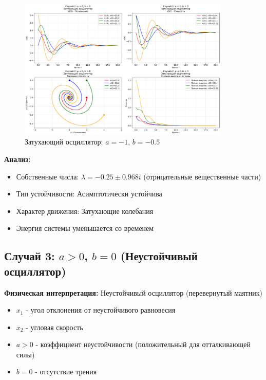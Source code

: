 \begin{figure}[H]
    \centering
    \includegraphics[width=0.9\textwidth]{images/task3/oscillator_case2_damped.png}
    \caption{Затухающий осциллятор: $a = -1$, $b = -0.5$}
\end{figure}

\textbf{Анализ:}
\begin{itemize}
    \item Собственные числа: $\lambda = -0.25 \pm 0.968i$ (отрицательные вещественные части)
    \item Тип устойчивости: Асимптотически устойчива
    \item Характер движения: Затухающие колебания
    \item Энергия системы уменьшается со временем
\end{itemize}

\subsection*{Случай 3: $a > 0$, $b = 0$ (Неустойчивый осциллятор)}

\textbf{Физическая интерпретация:} Неустойчивый осциллятор (перевернутый маятник)

\begin{itemize}
    \item $x_1$ - угол отклонения от неустойчивого равновесия
    \item $x_2$ - угловая скорость
    \item $a > 0$ - коэффициент неустойчивости (положительный для отталкивающей силы)
    \item $b = 0$ - отсутствие трения
\end{itemize}

